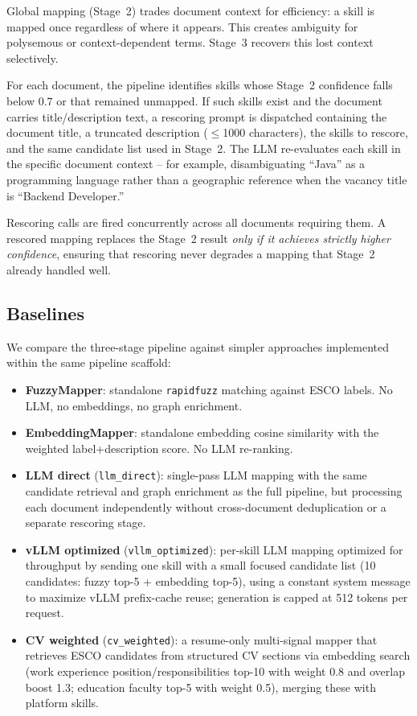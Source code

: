 \documentclass[11pt]{article}
\begin{document}
Global mapping (Stage~2) trades document context for efficiency: a skill is mapped once regardless of where it appears. This creates ambiguity for polysemous or context-dependent terms. Stage~3 recovers this lost context selectively.

For each document, the pipeline identifies skills whose Stage~2 confidence falls below $0.7$ or that remained unmapped. If such skills exist and the document carries title/description text, a rescoring prompt is dispatched containing the document title, a truncated description ($\leq$1000 characters), the skills to rescore, and the same candidate list used in Stage~2. The LLM re-evaluates each skill in the specific document context -- for example, disambiguating ``Java'' as a programming language rather than a geographic reference when the vacancy title is ``Backend Developer.''

Rescoring calls are fired concurrently across all documents requiring them. A rescored mapping replaces the Stage~2 result \emph{only if it achieves strictly higher confidence}, ensuring that rescoring never degrades a mapping that Stage~2 already handled well.

\subsection{Baselines}
\label{sec:baselines}

We compare the three-stage pipeline against simpler approaches implemented within the same pipeline scaffold:

\begin{itemize}
\setlength\itemsep{0.2em}
\item \textbf{FuzzyMapper}: standalone \texttt{rapidfuzz} matching against ESCO labels. No LLM, no embeddings, no graph enrichment.
\item \textbf{EmbeddingMapper}: standalone embedding cosine similarity with the weighted label+description score. No LLM re-ranking.
\item \textbf{LLM direct} (\texttt{llm\_direct}): single-pass LLM mapping with the same candidate retrieval and graph enrichment as the full pipeline, but processing each document independently without cross-document deduplication or a separate rescoring stage.
\item \textbf{vLLM optimized} (\texttt{vllm\_optimized}): per-skill LLM mapping optimized for throughput by sending one skill with a small focused candidate list (10 candidates: fuzzy top-5 + embedding top-5), using a constant system message to maximize vLLM prefix-cache reuse; generation is capped at 512 tokens per request.
\item \textbf{CV weighted} (\texttt{cv\_weighted}): a resume-only multi-signal mapper that retrieves ESCO candidates from structured CV sections via embedding search (work experience position/responsibilities top-10 with weight 0.8 and overlap boost 1.3; education faculty top-5 with weight 0.5), merging these with platform skills.
\end{itemize}
\end{document}

